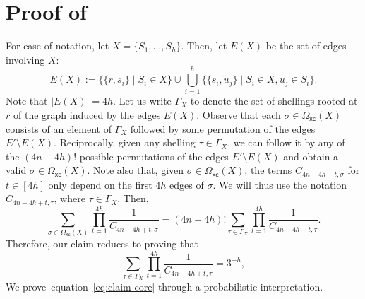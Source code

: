 \documentclass[11pt]{amsart}
\newcommand{\ns}{s}
\newcommand{\nou}{\tilde{u}}
\newcommand{\omxc}{\Omega_{\mathsf{xc}}}
\begin{document}
\section{Proof of~} \label{subsec:claim_shellings}
    For ease of notation, let $X = \{S_1, \dots, S_h\}$. Then, let $E(X)$ be the set of edges involving $X$:
    \[
    E(X) := \{ \{r, \ns_i\} \mid S_i \in X\} \cup \bigcup_{i=1}^h \{ \{\ns_i, \nou_j\} \mid S_i \in X, u_j \in S_i\}.
    \]
    Note that $|E(X)| = 4h$. Let us write $\Gamma_X$ to denote the set of shellings rooted at $r$ of the graph induced by the edges $E(X)$. Observe that each $\sigma \in \omxc(X)$ consists of an element of $\Gamma_X$ followed by some permutation of the edges $E' \setminus E(X)$. Reciprocally, given any shelling $\tau \in \Gamma_X$, we can follow it by any of the $(4n-4h)!$ possible permutations of the edges $E' \setminus E(X)$ and obtain a valid $\sigma \in \omxc(X)$. Note also that, given $\sigma \in \omxc(X)$, the terms $C_{4n-4h+t, \sigma}$ for $t \in [4h]$ only depend on the first $4h$ edges of $\sigma$. We will thus use the notation $C_{4n-4h+t, \tau}$, where $\tau \in \Gamma_X$. Then,
    \[
    \sum_{\sigma \in\omxc(X)} \prod_{t=1}^{4h} \frac{1}{C_{4n-4h+t, \sigma}} = (4n-4h)! \sum_{\tau \in\Gamma_X} \prod_{t=1}^{4h} \frac{1}{C_{4n-4h+t, \tau}}.
    \]
    Therefore, our claim reduces to proving that
      \begin{equation}\label{eq:claim-core}
          \sum_{\tau \in \Gamma_X} \prod_{t=1}^{4h} \frac{1}{C_{4n-4h+t, \tau}} = 3^{-h},
      \end{equation}
      We prove~equation~\eqref{eq:claim-core} through a probabilistic interpretation.
    
    
\end{document}
